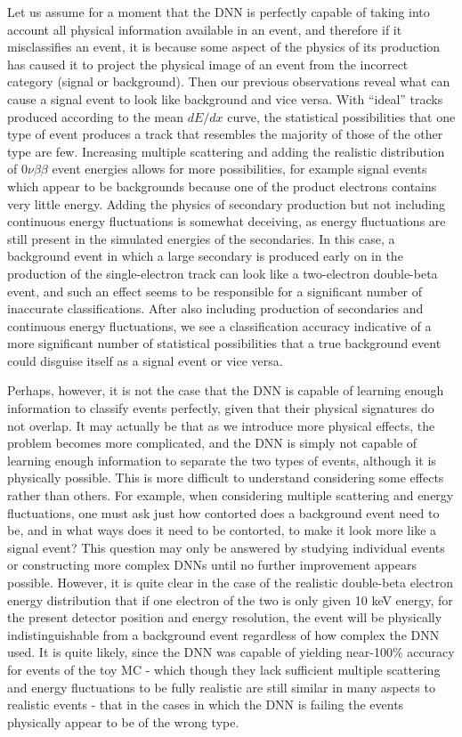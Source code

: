 \documentclass[a4paper,11pt]{article}
\begin{document}
Let us assume for a moment that the DNN is perfectly capable of taking into account all physical information available in an event, and therefore if it misclassifies an event, it is because some
aspect of the physics of its production has caused it to project the physical image of an event from the incorrect category (signal or background).  Then our previous observations reveal what can cause a signal event to look like background and vice versa.  With ``ideal'' tracks produced according to the mean $dE/dx$ curve, the statistical possibilities that one type of event produces a track that resembles the majority of those of the other type are few.  Increasing multiple scattering and adding the realistic distribution of $0\nu\beta\beta$ event energies allows for more possibilities, for example signal events which appear to be backgrounds because one of the product electrons contains very little energy.  Adding the physics of secondary production but not including continuous energy fluctuations is somewhat deceiving, as energy fluctuations are still present in the simulated energies of the secondaries.  In this case, a background event in which a large secondary is produced early on in the production of the single-electron track can look like a two-electron double-beta event, and such an effect seems to be responsible for a significant number of
inaccurate classifications.   After also including production of secondaries and continuous energy fluctuations, we see a classification accuracy indicative of a more significant number of statistical
possibilities that a true background event could disguise itself as a signal event or vice versa.

Perhaps, however, it is not the case that the DNN is capable of learning enough information to classify events perfectly, given that their physical signatures do not overlap.  It may actually be that
as we introduce more physical effects, the problem becomes more complicated, and the DNN is simply not capable of learning enough information to separate the two types of events, although it
is physically possible.  This is more difficult to understand considering some effects rather than others.   For example, when considering multiple scattering and energy fluctuations, one must ask
just how contorted does a background event need to be, and in what ways does it need to be contorted, to make it look more like a signal event?  This question may only be answered by studying
individual events or constructing more complex DNNs until no further improvement appears possible.  However, it is quite clear in the case of the realistic double-beta electron energy distribution
that if one electron of the two is only given 10 keV energy, for the present detector position and energy resolution, the event will be physically indistinguishable from a background event
regardless of how complex the DNN used.  It is quite likely, since the DNN was capable of yielding near-100\% accuracy for events of the toy MC - which though they lack sufficient multiple
scattering and energy fluctuations to be fully realistic are still similar in many aspects to realistic events - that in the cases in which the DNN is failing the events physically appear to be of
the wrong type.
\end{document}
